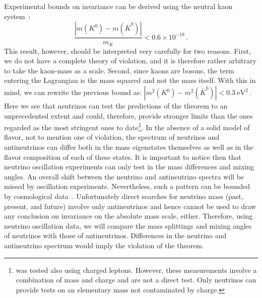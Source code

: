 Experimental bounds on  invariance can be derived using the neutral kaon system~\cite{Schwingenheuer:1995uf}:
%
\begin{equation}
  \frac{|m(K^0) - m(\overline{K}^0)|}{m_K} < 0.6 \times 10^{-18}\,. 
  \label{eq:mK}
\end{equation}
%
This result, however, should be interpreted very carefully for two reasons. First, we do not have a complete theory of  violation, and it is therefore rather arbitrary to take the kaon-mass as a scale. Second, since kaons are bosons, the term entering the Lagrangian is the mass squared and not the mass itself. With this in mind, we can rewrite the previous bound as:
%
 $ |m^2(K^0) - m^2(\overline{K}^0)| < 0.3~\mbox{eV}^2 \, $.
%
Here we %
see that neutrinos can test the predictions of the  theorem to an unprecedented extent and could, therefore, provide stronger limits than the ones regarded as the most stringent ones %
to date\footnote{ was tested also using charged leptons. However, these measurements involve a combination
of mass and charge and are not a direct  test. Only neutrinos can provide  tests on an elementary mass not contaminated by charge.}. 
%
In the absence of a solid model of flavor, not to mention one of  violation, the spectrum  of neutrinos and antineutrinos can differ both  in the mass eigenstates themselves as well as in the flavor composition of each of these states. It is important to notice then that neutrino oscillation experiments can  only test  in the mass differences and mixing angles. An overall shift between the neutrino and antineutrino spectra will be missed by oscillation experiments.  Nevertheless, such a pattern can be bounded by cosmological data~\cite{Barenboim:2017vlc}. Unfortunately direct searches for neutrino mass (past, present, and future) involve only antineutrinos and hence 
cannot be used to draw any conclusion on   invariance on the absolute mass scale,  either.
%
Therefore, using neutrino oscillation data, we will compare the mass splittings and mixing angles of  neutrinos with those of antineutrinos. Differences in the neutrino and antineutrino spectrum would imply the violation of the  theorem.

